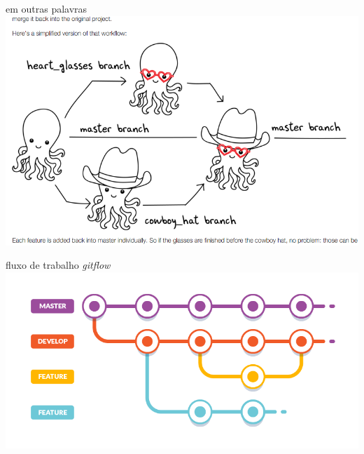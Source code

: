 \documentclass[11pt]{beamer}
\begin{document}
\begin{frame}{em outras palavras}
\includegraphics[scale=.4]{jennifer_gilbert.png}
\end{frame}


\begin{frame}{fluxo de trabalho \textit{gitflow}}
\includegraphics[scale=.4]{gitflow.png}
\end{frame}







\end{document}
